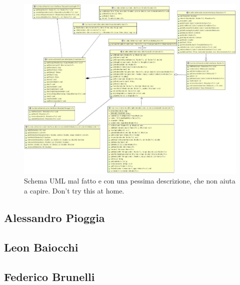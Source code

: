 \begin{figure}[h]
	\centering{}
	\includegraphics[width=\textwidth]{img/badarch}
	\caption{Schema UML mal fatto e con una pessima descrizione, che non aiuta a capire. Don't try this at home.}
	\label{img:badarch}
\end{figure}



\newpage

\subsection*{Alessandro Pioggia}


\newpage

\subsection*{Leon Baiocchi}


\newpage

\subsection*{Federico Brunelli}

